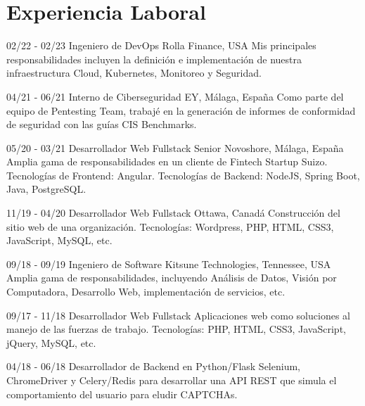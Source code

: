 \documentclass[]{friggeri-cv}
\begin{document}
\section{Experiencia Laboral}
\begin{entrylist}
  \entry
    {02/22 - 02/23}
    {Ingeniero de DevOps}
    {Rolla Finance, USA}
    {Mis principales responsabilidades incluyen la definición e implementación de nuestra infraestructura Cloud, Kubernetes, Monitoreo y Seguridad.\\}

  \entry
    {04/21 - 06/21}
    {Interno de Ciberseguridad}
    {EY, Málaga, España}
    {Como parte del equipo de Pentesting Team, trabajé en la generación de informes de conformidad de seguridad con las guías CIS Benchmarks.\\}

  \entry
    {05/20 - 03/21}
    {Desarrollador Web Fullstack Senior}
    {Novoshore, Málaga, España}
    {Amplia gama de responsabilidades en un cliente de Fintech Startup Suizo. Tecnologías de Frontend: Angular. Tecnologías de Backend: NodeJS, Spring Boot, Java, PostgreSQL.\\}

  \entry
    {11/19 - 04/20}
    {Desarrollador Web Fullstack}
    {Ottawa, Canadá} %
    {Construcción del sitio web de una organización. Tecnologías: Wordpress, PHP, HTML, CSS3, JavaScript, MySQL, etc.\\}

  \entry
    {09/18 - 09/19}
    {Ingeniero de Software}
    {Kitsune Technologies, Tennessee, USA}
    {Amplia gama de responsabilidades, incluyendo Análisis de Datos, Visión por Computadora, Desarrollo Web, implementación de servicios, etc.\\}

  \entry
    {09/17 - 11/18}
    {Desarrollador Web Fullstack}
    {}
    {Aplicaciones web como soluciones al manejo de las fuerzas de trabajo. Tecnologías: PHP, HTML, CSS3, JavaScript, jQuery, MySQL, etc.\\}
    
  \entry
    {04/18 - 06/18}
    {Desarrollador de Backend en Python/Flask}
    {} 
    {Selenium, ChromeDriver y Celery/Redis para desarrollar una API REST que simula el comportamiento del usuario para eludir CAPTCHAs.\\}    
    

\end{entrylist}
\end{document}
